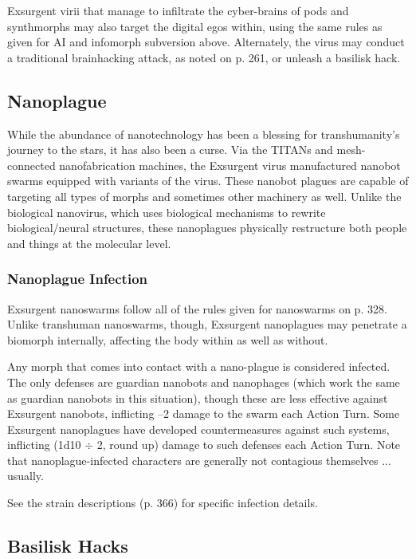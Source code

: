 Exsurgent virii that manage to infiltrate the cyber-brains
of pods and synthmorphs may also target the
digital egos within, using the same rules as given for 
AI and infomorph subversion above. Alternately, the 
virus may conduct a traditional brainhacking attack, 
as noted on p. 261, or unleash a basilisk hack. 

\subsection{Nanoplague}

While the abundance of nanotechnology has been a 
blessing for transhumanity's journey to the stars, it has 
also been a curse. Via the TITANs and mesh-connected 
nanofabrication machines, the Exsurgent virus manufactured
nanobot swarms equipped with variants of
the virus. These nanobot plagues are capable of targeting
all types of morphs and sometimes other machinery
as well. Unlike the biological nanovirus, which uses
biological mechanisms to rewrite biological/neural 
structures, these nanoplagues physically restructure 
both people and things at the molecular level.

\subsubsection{Nanoplague Infection}

Exsurgent nanoswarms follow all of the rules given 
for nanoswarms on p. 328. Unlike transhuman 
nanoswarms, though, Exsurgent nanoplagues may 
penetrate a biomorph internally, affecting the body 
within as well as without.

Any morph that comes into contact with a nano-plague
is considered infected. The only defenses are
guardian nanobots and nanophages (which work the 
same as guardian nanobots in this situation), though 
these are less effective against Exsurgent nanobots, 
inflicting –2 damage to the swarm each Action Turn. 
Some Exsurgent nanoplagues have developed countermeasures
against such systems, inflicting (1d10 $\div$ 2,
round up) damage to such defenses each Action Turn. 
Note that nanoplague-infected characters are generally
not contagious themselves ... usually.

See the strain descriptions (p. 366) for specific infection
details.

\subsection{Basilisk Hacks}

